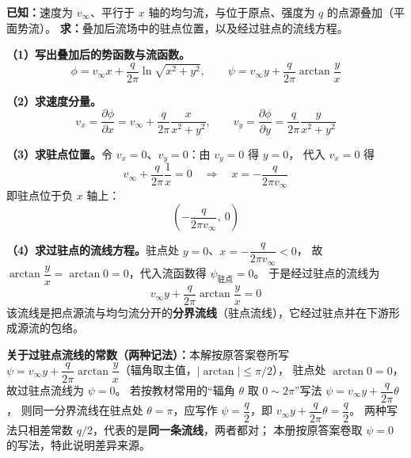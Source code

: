 \begin{jie}
\textbf{已知：}速度为 $v_\infty$、平行于 $x$ 轴的均匀流，与位于原点、强度为 $q$ 的点源叠加（平面势流）。
\textbf{求：}叠加后流场中的驻点位置，以及经过驻点的流线方程。

\textbf{（1）写出叠加后的势函数与流函数。}
\[
\phi=v_\infty x+\frac{q}{2\pi}\ln\sqrt{x^{2}+y^{2}},
\qquad
\psi=v_\infty y+\frac{q}{2\pi}\arctan\frac{y}{x}
\]

\textbf{（2）求速度分量。}
\[
v_x=\frac{\partial\phi}{\partial x}=v_\infty+\frac{q}{2\pi}\frac{x}{x^{2}+y^{2}},
\qquad
v_y=\frac{\partial\phi}{\partial y}=\frac{q}{2\pi}\frac{y}{x^{2}+y^{2}}
\]

\textbf{（3）求驻点位置。}令 $v_x=0$、$v_y=0$：由 $v_y=0$ 得 $y=0$，
代入 $v_x=0$ 得
\[
v_\infty+\frac{q}{2\pi}\frac{1}{x}=0
\quad\Longrightarrow\quad
x=-\frac{q}{2\pi v_\infty}
\]
即驻点位于负 $x$ 轴上：
\[
\boxed{\left(-\frac{q}{2\pi v_\infty},\ 0\right)}
\]

\textbf{（4）求过驻点的流线方程。}驻点处 $y=0$、$x=-\dfrac{q}{2\pi v_\infty}<0$，
故 $\arctan\dfrac{y}{x}=\arctan 0=0$，代入流函数得 $\psi_{\text{驻点}}=0$。
于是经过驻点的流线为
\[
\boxed{v_\infty y+\frac{q}{2\pi}\arctan\frac{y}{x}=0}
\]
该流线是把点源流与均匀流分开的\textbf{分界流线}（驻点流线），它经过驻点并在下游形成源流的包络。
\end{jie}

\begin{tishi}
\textbf{关于过驻点流线的常数（两种记法）：}本解按原答案卷所写
$\psi=v_\infty y+\dfrac{q}{2\pi}\arctan\dfrac{y}{x}$（辐角取主值，$|\arctan|\le\pi/2$），
驻点处 $\arctan 0=0$，故过驻点流线为 $\psi=0$。
若按教材常用的“辐角 $\theta$ 取 $0\sim2\pi$”写法 $\psi=v_\infty y+\dfrac{q}{2\pi}\theta$，
则同一分界流线在驻点处 $\theta=\pi$，应写作 $\psi=\dfrac{q}{2}$，即
$v_\infty y+\dfrac{q}{2\pi}\theta=\dfrac{q}{2}$。
两种写法只相差常数 $q/2$，代表的是\textbf{同一条流线}，两者都对；
本册按原答案卷取 $\psi=0$ 的写法，特此说明差异来源。
\end{tishi}



